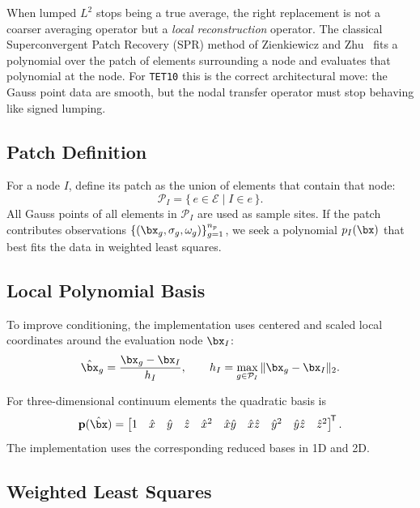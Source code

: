 When lumped $L^2$ stops being a true average, the right replacement is not a
coarser averaging operator but a \emph{local reconstruction} operator.  The
classical Superconvergent Patch Recovery (SPR) method of Zienkiewicz and
Zhu~\cite{ZienkiewiczZhu1992a,ZienkiewiczZhu1992b} fits a polynomial over the
patch of elements surrounding a node and evaluates that polynomial at the
node.  For \texttt{TET10} this is the correct architectural move: the Gauss
point data are smooth, but the nodal transfer operator must stop behaving like
signed lumping.

\subsection{Patch Definition}

For a node $I$, define its patch as the union of elements that contain that
node:
\begin{equation}
  \mathcal{P}_I = \{\, e \in \mathcal{E} \mid I \in e \,\}.
\end{equation}
All Gauss points of all elements in $\mathcal{P}_I$ are used as sample sites.
If the patch contributes observations
$\{(\bx_g, \sigma_g, \omega_g)\}_{g=1}^{n_p}$, we seek a polynomial
$p_I(\bx)$ that best fits the data in weighted least squares.

\subsection{Local Polynomial Basis}

To improve conditioning, the implementation uses centered and scaled local
coordinates around the evaluation node $\bx_I$:
\begin{equation}
  \hat{\bx}_g = \frac{\bx_g - \bx_I}{h_I},
  \qquad
  h_I = \max_{g \in \mathcal{P}_I} \|\bx_g - \bx_I\|_2.
\end{equation}

For three-dimensional continuum elements the quadratic basis is
\begin{equation}
  \mathbf{p}(\hat{\bx}) =
  \begin{bmatrix}
  1 &
  \hat{x} &
  \hat{y} &
  \hat{z} &
  \hat{x}^2 &
  \hat{x}\hat{y} &
  \hat{x}\hat{z} &
  \hat{y}^2 &
  \hat{y}\hat{z} &
  \hat{z}^2
  \end{bmatrix}^{\!\mathsf{T}}.
\end{equation}
The implementation uses the corresponding reduced bases in 1D and 2D.

\subsection{Weighted Least Squares}

